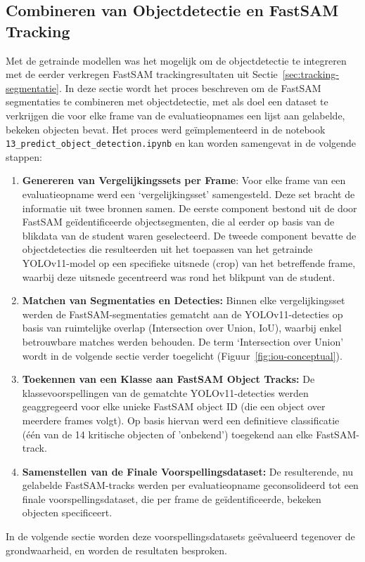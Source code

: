 \subsection{Combineren van Objectdetectie en FastSAM Tracking}

Met de getrainde modellen was het mogelijk om de objectdetectie te integreren met de eerder verkregen FastSAM trackingresultaten uit Sectie~\ref{sec:tracking-segmentatie}.
In deze sectie wordt het proces beschreven om de FastSAM segmentaties te combineren met objectdetectie,
met als doel een dataset te verkrijgen die voor elke frame van de evaluatieopnames een lijst aan gelabelde, bekeken objecten bevat.
Het proces werd geïmplementeerd in de notebook \texttt{13\_predict\_object\_detection.ipynb} en kan worden samengevat in de volgende stappen:
\begin{enumerate}
    \item \textbf{Genereren van Vergelijkingssets per Frame}: Voor elke frame van een evaluatieopname werd een 
    `vergelijkingsset' samengesteld. 
    Deze set bracht de informatie uit twee bronnen samen. 
    De eerste component bestond uit de door FastSAM geïdentificeerde objectsegmenten, 
    die al eerder op basis van de blikdata van de student waren geselecteerd. 
    De tweede component bevatte de objectdetecties die resulteerden uit het toepassen van het getrainde 
    YOLOv11-model op een specifieke uitsnede (crop) van het betreffende frame, 
    waarbij deze uitsnede gecentreerd was rond het blikpunt van de student.
    \item \textbf{Matchen van Segmentaties en Detecties:} 
    Binnen elke vergelijkingsset werden de FastSAM-segmentaties gematcht aan de YOLOv11-detecties op 
    basis van ruimtelijke overlap (Intersection over Union, IoU), waarbij enkel betrouwbare matches werden behouden.
    De term `Intersection over Union' wordt in de volgende sectie verder toegelicht (Figuur~\ref{fig:iou-conceptual}).
    \item \textbf{Toekennen van een Klasse aan FastSAM Object Tracks:} 
    De klassevoorspellingen van de gematchte YOLOv11-detecties werden geaggregeerd voor elke unieke FastSAM object ID 
    (die een object over meerdere frames volgt). 
    Op basis hiervan werd een definitieve classificatie (één van de 14 kritische objecten of 'onbekend') 
    toegekend aan elke FastSAM-track.
    \item \textbf{Samenstellen van de Finale Voorspellingsdataset:} 
    De resulterende, nu gelabelde FastSAM-tracks werden per evaluatieopname geconsolideerd 
    tot een finale voorspellingsdataset, die per frame de geïdentificeerde, bekeken objecten specificeert.
\end{enumerate}
In de volgende sectie worden deze voorspellingsdatasets geëvalueerd tegenover de grondwaarheid, en worden de resultaten besproken.

